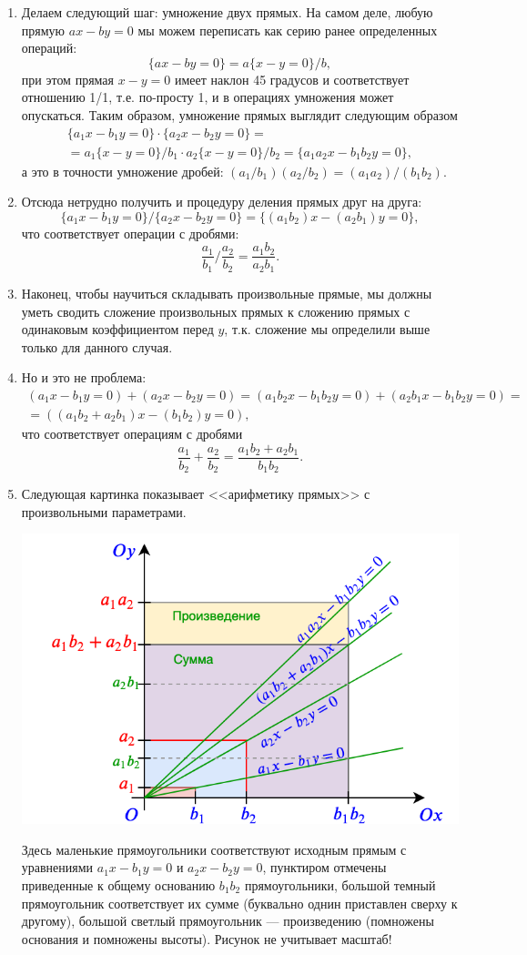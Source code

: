 \begin{enumerate}
\item Делаем следующий шаг: умножение двух прямых. На самом деле, любую прямую $ax-by=0$ мы можем переписать как серию ранее определенных операций:
$$
\{ax-by=0\} = a\{x-y=0\}/b,
$$
при этом прямая $x-y=0$ имеет наклон 45 градусов и соответствует отношению 1/1, т.е. по-просту 1, и в операциях умножения может опускаться. Таким образом, умножение прямых выглядит следующим образом
\begin{gather*}
\{a_1x-b_1y=0\}\cdot\{a_2x-b_2y=0\} = \\
= a_1\{x-y=0\}/b_1\cdot a_2\{x-y=0\}/b_2 = \{a_1a_2x-b_1b_2y=0\},
\end{gather*}
а это в точности умножение дробей: $(a_1/b_1)(a_2/b_2) = (a_1a_2)/(b_1b_2)$.
\item Отсюда нетрудно получить и процедуру деления прямых друг на друга:
$$
\{a_1x-b_1y=0\}/\{a_2x-b_2y=0\} = \{(a_1b_2)x-(a_2b_1)y=0\},
$$
что соответствует операции с дробями:
$$
\frac{a_1}{b_1}/\frac{a_2}{b_2} = \frac{a_1b_2}{a_2b_1}.
$$
\item Наконец, чтобы научиться складывать произвольные прямые, мы должны уметь сводить сложение произвольных прямых к сложению прямых с одинаковым коэффициентом перед $y$, т.к. сложение мы определили выше только для данного случая.
\item Но и это не проблема:
\begin{gather*}
(a_1x-b_1y=0)+(a_2x-b_2y=0) = (a_1b_2x-b_1b_2y=0) + (a_2b_1x-b_1b_2y=0) = \\
= ((a_1b_2+a_2b_1)x-(b_1b_2)y=0),
\end{gather*}
что соответствует операциям с дробями
$$
\frac{a_1}{b_2}+\frac{a_2}{b_2} = \frac{a_1b_2+a_2b_1}{b_1b_2}.
$$
\item Следующая картинка показывает <<арифметику прямых>> с произвольными параметрами.
\begin{center}
\includegraphics[scale=0.5]{linear.png}
\end{center}
Здесь маленькие прямоугольники соответствуют исходным прямым с уравнениями $a_1x-b_1y=0$ и $a_2x-b_2y=0$, пунктиром отмечены приведенные к общему основанию $b_1b_2$ прямоугольники, большой темный прямоугольник соответствует их сумме (буквально однин приставлен сверху к другому), большой светлый прямоугольник --- произведению (помножены основания и помножены высоты). Рисунок не учитывает масштаб!


\end{enumerate}

